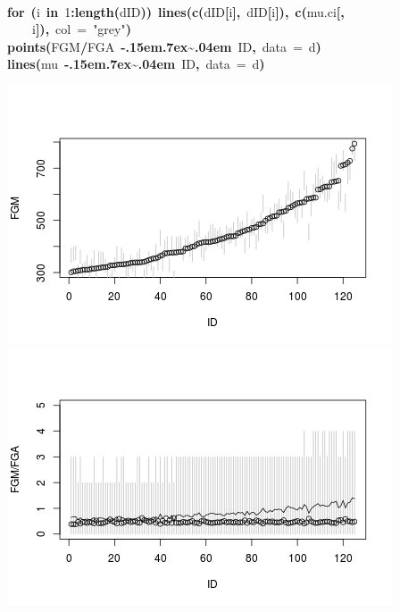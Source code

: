 \documentclass{article}
\makeatletter
\newcommand{\hlnumber}[1]{\textcolor[rgb]{0,0,0}{#1}}%
\newcommand{\hlfunctioncall}[1]{\textcolor[rgb]{.5,0,.33}{\textbf{#1}}}%
\newcommand{\hlstring}[1]{\textcolor[rgb]{.6,.6,1}{#1}}%
\newcommand{\hlkeyword}[1]{\textbf{#1}}%
\newcommand{\hlargument}[1]{\textcolor[rgb]{.69,.25,.02}{#1}}%
\newcommand{\hlsymbol}[1]{#1}%
\def\urltilda{\kern -.15em\lower .7ex\hbox{\~{}}\kern .04em}%
\newcommand{\hlstd}[1]{\textcolor[rgb]{0,0,0}{#1}}%
\newenvironment{kframe}{%
 \def\FrameCommand##1{\hskip\@totalleftmargin \hskip-\fboxsep
 \colorbox{shadecolor}{##1}\hskip-\fboxsep
     \hskip-\linewidth \hskip-\@totalleftmargin \hskip\columnwidth}%
 \MakeFramed {\advance\hsize-\width
   \@totalleftmargin\z@ \linewidth\hsize
   \@setminipage}}%
 {\par\unskip\endMakeFramed}
\newenvironment{knitrout}{}{} %
\makeatother
\begin{document}
\begin{knitrout}
{\begin{kframe}
\begin{flushleft}
\hlstd{}\hspace*{\fill}\\
\hlstd{}\hlkeyword{for}{\ }\hlkeyword{(}\hlsymbol{i}{\ }\hlkeyword{in}{\ }\hlnumber{1}\hlkeyword{:}\hlfunctioncall{length}\hlkeyword{(}\hlsymbol{d}\hlkeyword{\usebox{\hlnormalsizeboxdollar}}\hlsymbol{ID}\hlkeyword{)}\hlkeyword{)}{\ }\hlfunctioncall{lines}\hlkeyword{(}\hlfunctioncall{c}\hlkeyword{(}\hlsymbol{d}\hlkeyword{\usebox{\hlnormalsizeboxdollar}}\hlsymbol{ID}\hlkeyword{[}\hlsymbol{i}\hlkeyword{]}\hlkeyword{,}{\ }\hlsymbol{d}\hlkeyword{\usebox{\hlnormalsizeboxdollar}}\hlsymbol{ID}\hlkeyword{[}\hlsymbol{i}\hlkeyword{]}\hlkeyword{)}\hlkeyword{,}{\ }\hlfunctioncall{c}\hlkeyword{(}\hlsymbol{mu.ci}\hlkeyword{[}\hlkeyword{,}\hspace*{\fill}\\
\hlstd{}{\ }{\ }{\ }{\ }\hlsymbol{i}\hlkeyword{]}\hlkeyword{)}\hlkeyword{,}{\ }\hlargument{col}{\ }\hlargument{=}{\ }\hlstring{"{}grey"{}}\hlkeyword{)}\hspace*{\fill}\\
\hlstd{}\hlfunctioncall{points}\hlkeyword{(}\hlsymbol{FGM}\hlkeyword{/}\hlsymbol{FGA}{\ }\hlkeyword{\urltilda{}}{\ }\hlsymbol{ID}\hlkeyword{,}{\ }\hlargument{data}{\ }\hlargument{=}{\ }\hlsymbol{d}\hlkeyword{)}\hspace*{\fill}\\
\hlstd{}\hlfunctioncall{lines}\hlkeyword{(}\hlsymbol{mu}{\ }\hlkeyword{\urltilda{}}{\ }\hlsymbol{ID}\hlkeyword{,}{\ }\hlargument{data}{\ }\hlargument{=}{\ }\hlsymbol{d}\hlkeyword{)}\mbox{}
\normalfont
\end{flushleft}


\centering{}\includegraphics{post-bs1} \includegraphics{post-bs2} 


\end{kframe}}
\end{knitrout}
\end{document}
